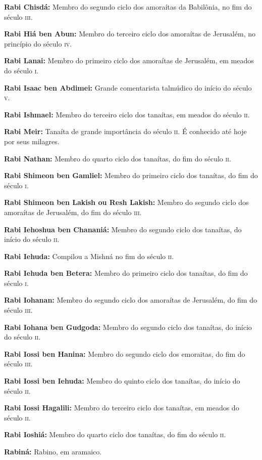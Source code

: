 \begin{hangparas}{.25in}{1}
{\textbf{Rabi Chisdá:} Membro do segundo ciclo dos amoraítas da Babilônia, 
no fim do século \textsc{iii}.

\textbf{Rabi Hiá ben Abun:} Membro do terceiro ciclo dos amoraítas de
Jerusalém, no princípio do século \textsc{iv}.

\textbf{Rabi Lanai:} Membro do primeiro ciclo dos amoraítas de Jerusalém, 
em meados do século \textsc{i}.

\textbf{Rabi Isaac ben Abdimei:} Grande comentarista talmúdico do
início do século \textsc{v}.

\textbf{Rabi Ishmael:} Membro do terceiro ciclo dos tanaítas, em meados 
do século \textsc{ii}.

\textbf{Rabi Meir:} Tanaíta de grande importância do século \textsc{ii}. 
É conhecido até hoje por seus milagres.

\textbf{Rabi Nathan:} Membro do quarto ciclo dos tanaítas, 
do fim do século \textsc{ii}.

\textbf{Rabi Shimeon ben Gamliel:} Membro do primeiro ciclo dos
tanaítas, do fim do século \textsc{i}.

\textbf{Rabi Shimeon ben Lakish ou Resh Lakish:} Membro do segundo
ciclo dos amoraítas de Jerusalém, do fim do século \textsc{iii}.

\textbf{Rabi Iehoshua ben Chananiá:} Membro do segundo ciclo dos tanaítas, 
do início do século \textsc{ii}.

\textbf{Rabi Iehuda:} Compilou a Mishná no fim do século \textsc{ii}.

\textbf{Rabi Iehuda ben Betera:} Membro do primeiro ciclo dos tanaítas, do
fim do século \textsc{i}.

\textbf{Rabi Iohanan:} Membro do segundo ciclo dos amoraítas de Jerusalém,
do fim do século \textsc{iii}.

\textbf{Rabi Iohana ben Gudgoda:} Membro do segundo ciclo dos tanaítas, do
início do século \textsc{ii}.

\textbf{Rabi Iossi ben Hanina:} Membro do segundo ciclo dos emoraitas, 
do fim do século \textsc{iii}.

\textbf{Rabi Iossi ben Iehuda:} Membro do quinto ciclo dos tanaítas, do início do
século \textsc{ii}.

\textbf{Rabi Iossi Hagalili:} Membro do terceiro ciclo dos tanaítas, 
em meados do século \textsc{ii}.

\textbf{Rabi Ioshiá:} Membro do quarto ciclo dos tanaítas, do fim do século \textsc{ii}.

\textbf{Rabiná:} Rabino, em aramaico.

}
\end{hangparas}
